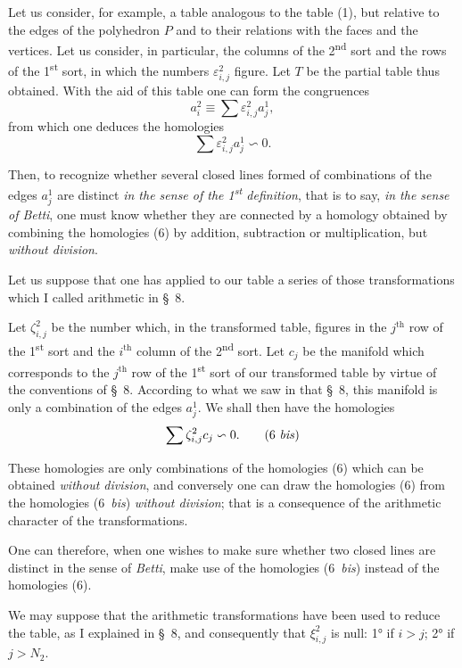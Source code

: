 \documentclass{article}
\begin{document}
Let us consider, for example, a table analogous to the table (1), but relative to the edges of the polyhedron $P$ and to their relations with the faces and the vertices. Let us consider, in particular, the columns of the 2\textsuperscript{nd} sort and the rows of the 1\textsuperscript{st} sort, in which the numbers $\varepsilon^{2}_{i,j}$ figure. Let $T$ be the partial table thus obtained. With the aid of this table one can form the congruences
\[ a^{2}_{i} \equiv \sum \varepsilon^{2}_{i,j} a^{1}_{j}, \]
from which one deduces the homologies
\[ \sum \varepsilon^{2}_{i,j} a^{1}_{j} \backsim 0. \tag{6} \]

Then, to recognize whether several closed lines formed of
combinations of the edges $a^{1}_{j}$ are distinct \emph{in the sense of the 1\textsuperscript{st} definition}, that is to say, \emph{in the sense of Betti}, one must know whether they are connected by a homology obtained by combining the homologies (6) by addition, subtraction or multiplication, but \emph{without division}.

Let us suppose that one has applied to our table a series of those transformations which I called arithmetic in \S~8.

Let $\zeta^{2}_{i,j}$ be the number which, in the transformed table, figures in the $j^{\text{th}}$ row of the 1\textsuperscript{st} sort and the $i^{\text{th}}$ column of the 2\textsuperscript{nd} sort. Let $c_{j}$ be the manifold which corresponds to the $j^{\text{th}}$ row of the 1\textsuperscript{st} sort of our transformed table by virtue of the conventions of \S~8. According to what we saw in that \S~8, this manifold is only a combination of the edges $a^{1}_{j}$. We shall then have the homologies
\[ \sum \zeta^{2}_{i,j} c_{j} \backsim 0. \tag{6 \textit{bis}} \]

These homologies are only combinations of the homologies (6) which can be obtained \emph{without division}, and conversely one can draw the homologies (6) from the homologies (6~\emph{bis}) \emph{without division}; that is a consequence of the arithmetic character of the transformations.

One can therefore, when one wishes to make sure whether two closed lines are distinct in the sense of \emph{Betti}, make use of the homologies (6~\emph{bis}) instead of the homologies (6).

We may suppose that the arithmetic transformations have been used to reduce the table, as I explained in \S~8, and consequently that $\xi^{2}_{i,j}$ is null: 1° if $i > j$; 2° if $j > N_{2}$.
\end{document}
